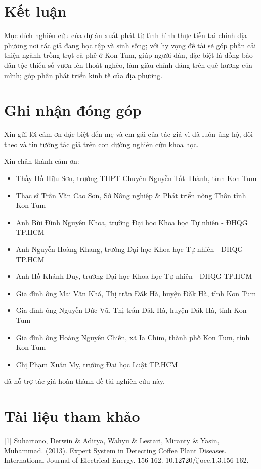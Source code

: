 \documentclass[a4paper,14pt]{extarticle}
\begin{document}
\section{Kết luận}
Mục đích nghiên cứu của dự án xuất phát từ tình hình thực tiễn tại chính địa phương nơi tác giả đang học tập và sinh sống; với hy vọng đề tài sẽ góp phần cải thiện ngành trồng trọt cà phê ở Kon Tum, giúp người dân, đặc biệt là đồng bào dân tộc thiểu số vươn lên thoát nghèo, làm giàu chính đáng trên quê hương của mình; góp phần phát triển kinh tế của địa phương.

\section{Ghi nhận đóng góp}
Xin gửi lời cảm ơn đặc biệt đến mẹ và em gái của tác giả vì đã luôn ủng hộ, dõi theo và tin tưởng tác giả trên con đường nghiên cứu khoa học.

\null

Xin chân thành cảm ơn:
\begin{itemize}
	\item Thầy Hồ Hữu Sơn, trường THPT Chuyên Nguyễn Tất Thành, tỉnh Kon Tum
	\item Thạc sĩ Trần Văn Cao Sơn, Sở Nông nghiệp \& Phát triển nông Thôn tỉnh Kon Tum
	\item Anh Bùi Đình Nguyên Khoa, trường Đại học Khoa học Tự nhiên - ĐHQG TP.HCM
	\item Anh Nguyễn Hoàng Khang, trường Đại học Khoa học Tự nhiên - ĐHQG TP.HCM
	\item Anh Hồ Khánh Duy, trường Đại học Khoa học Tự nhiên - ĐHQG TP.HCM
	\item Gia đình ông Mai Văn Khá, Thị trấn Đăk Hà, huyện Đăk Hà, tỉnh Kon Tum
	\item Gia đình ông Nguyễn Đức Vũ, Thị trấn Đăk Hà, huyện Đăk Hà, tỉnh Kon Tum
	\item Gia đình ông Hoàng Nguyên Chiến, xã Ia Chim, thành phố Kon Tum, tỉnh Kon Tum
	\item Chị Phạm Xuân My, trường Đại học Luật TP.HCM
\end{itemize}
	đã hỗ trợ tác giả hoàn thành đề tài nghiên cứu này.

\section{Tài liệu tham khảo}
[1] Suhartono, Derwin \& Aditya, Wahyu \& Lestari, Miranty \& Yasin, Muhammad. (2013). Expert System in Detecting Coffee Plant Diseases. International Journal of Electrical Energy. 156-162. 10.12720/ijoee.1.3.156-162.
\end{document}
